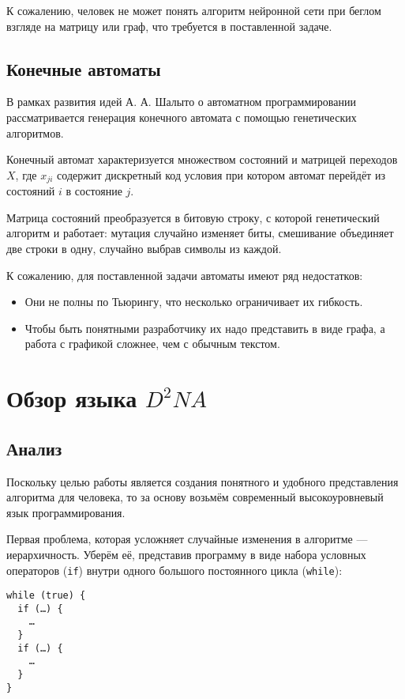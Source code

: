 \documentclass[utf8,a5paper,portrait,10pt,twoside]{eskdtext}
\begin{document}
К сожалению, человек не может понять алгоритм нейронной сети при беглом взгляде
на матрицу или граф, что требуется в поставленной задаче.

\subsection{Конечные автоматы}

В рамках развития идей А. А. Шалыто о автоматном программировании
рассматривается генерация конечного автомата с помощью генетических
алгоритмов.\cite{shalyto}

Конечный автомат характеризуется множеством состояний и матрицей переходов $X$,
где $x_{ji}$ содержит дискретный код условия при котором автомат перейдёт из
состояний $i$ в состояние $j$.

Матрица состояний преобразуется в битовую строку, с которой генетический
алгоритм и работает: мутация случайно изменяет биты, смешивание объединяет две
строки в одну, случайно выбрав символы из каждой.

К сожалению, для поставленной задачи автоматы имеют ряд недостатков:
\begin{itemize}
  \item Они не полны по Тьюрингу, что несколько ограничивает их гибкость.
  \item Чтобы быть понятными разработчику их надо представить в виде графа, а
        работа с графикой сложнее, чем с обычным текстом.
\end{itemize}

\newpage
\section{Обзор языка $D^2NA$}

\subsection{Анализ}

Поскольку целью работы является создания понятного и удобного представления
алгоритма для человека, то за основу возьмём современный высокоуровневый язык
программирования.

Первая проблема, которая усложняет случайные изменения в алгоритме —
иерархичность. Уберём её, представив программу в виде набора
условных операторов (\texttt{if}) внутри одного большого постоянного цикла
(\texttt{while}):

\begin{verbatim}
while (true) {
  if (…) {
    …
  }
  if (…) {
    …
  }
}
\end{verbatim}
\end{document}
